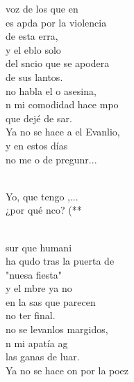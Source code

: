 \documentclass[12pt]{article}
\begin{document}
\begin{multicols*}{2}
\begin{cancion}%
	 voz de los que en\\
	es apda por la violencia \\
	de esta erra,\\
	y el eblo solo \\
	del sncio que se apodera \\
	de sus lantos.\\
\jump
	no habla el o asesina,\\
	n mi comodidad hace mpo \\
	que dejé de sar.\\
	Ya no se hace a el Evanlio, \\
y en estos días \\
	no me o de pregunr...\\\jump\\
	\begin{chorus}%
	Yo, que tengo ,...  \\
	¿por qué nco? (** \\
	\end{chorus}%
	\jump\\
	 sur que humani\\
	ha qudo tras la puerta de \\
	"nuesa fiesta"\\
	y el mbre ya no \\
	en la sas que parecen \\
	no ter final.\\
\jump
	no se levanlos margidos,\\
	n mi apatía ag  \\
	las ganas de luar.\\
	Ya no se hace on por la poez\\

\end{cancion}
\end{multicols*}
\end{document}
